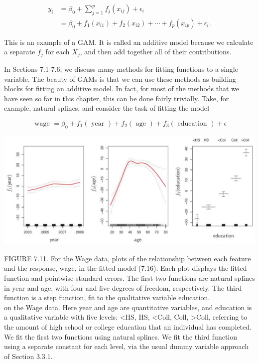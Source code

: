 \documentclass[10pt]{article}
\begin{document}
\begin{align*}
y_{i} & =\beta_{0}+\sum_{j=1}^{p} f_{j}\left(x_{i j}\right)+\epsilon_{i} \\
& =\beta_{0}+f_{1}\left(x_{i 1}\right)+f_{2}\left(x_{i 2}\right)+\cdots+f_{p}\left(x_{i p}\right)+\epsilon_{i} . \tag{7.15}
\end{align*}


This is an example of a GAM. It is called an additive model because we calculate a separate $f_{j}$ for each $X_{j}$, and then add together all of their contributions.

In Sections 7.1-7.6, we discuss many methods for fitting functions to a single variable. The beauty of GAMs is that we can use these methods as building blocks for fitting an additive model. In fact, for most of the methods that we have seen so far in this chapter, this can be done fairly trivially. Take, for example, natural splines, and consider the task of fitting the model


\begin{equation*}
\text { wage }=\beta_{0}+f_{1}(\text { year })+f_{2}(\text { age })+f_{3}(\text { education })+\epsilon \tag{7.16}
\end{equation*}


\begin{center}
\includegraphics[max width=\textwidth]{2025_05_05_efe77898333945044de4g-299}
\end{center}

FIGURE 7.11. For the Wage data, plots of the relationship between each feature and the response, wage, in the fitted model (7.16). Each plot displays the fitted function and pointwise standard errors. The first two functions are natural splines in year and age, with four and five degrees of freedom, respectively. The third function is a step function, fit to the qualitative variable education.\\
on the Wage data. Here year and age are quantitative variables, and education is a qualitative variable with five levels: <HS, HS, <Coll, Coll, >Coll, referring to the amount of high school or college education that an individual has completed. We fit the first two functions using natural splines. We fit the third function using a separate constant for each level, via the usual dummy variable approach of Section 3.3.1.
\end{document}
